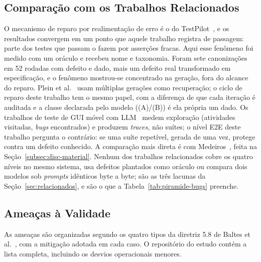 \documentclass[12pt]{article}
\begin{document}
\subsection{Comparação com os Trabalhos Relacionados}
\label{subsec:disc-relacionados}

O mecanismo de reparo por realimentação de erro é o do
TestPilot~\cite{schafer2024testpilot}, e os resultados convergem em um ponto
que aquele trabalho registra de passagem: parte dos testes que passam o
fazem por asserções fracas. Aqui esse fenômeno foi medido com um oráculo e
recebeu nome e taxonomia. Foram sete canonizações em 52 rodadas com defeito e
dado, mais um defeito real transformado em especificação, e o fenômeno
mostrou-se concentrado na geração, fora do alcance do reparo. Plein et al.~\cite{plein2023bugreports}
usam múltiplas gerações como recuperação; o ciclo de reparo deste trabalho
tem o mesmo papel, com a diferença de que cada iteração é auditada e a
classe declarada pelo modelo ((A)/(B)) é ela própria um dado. Os trabalhos de
teste de GUI móvel com LLM~\cite{liu2024gptdroid,yoon2024droidagent,liu2023qtypist}
medem exploração (atividades visitadas, \textit{bugs} encontrados) e
produzem \textit{traces}, não suítes; o nível E2E deste trabalho pergunta o
contrário: se uma suíte repetível, gerada de uma vez, protege contra um
defeito conhecido. A comparação mais direta é com
Medeiros~\cite{medeiros2026acessibilidade}, feita na
Seção~\ref{subsec:disc-material}. Nenhum dos trabalhos relacionados cobre os quatro níveis no
mesmo sistema, usa defeitos plantados como oráculo ou compara dois modelos
sob \textit{prompts} idênticos byte a byte; são as três lacunas da
Seção~\ref{sec:relacionados}, e são o que a Tabela~\ref{tab:piramide-bugs}
preenche.

\subsection{Ameaças à Validade}
\label{subsec:ameacas}

As ameaças são organizadas segundo os quatro tipos da diretriz 5.8 de
Baltes et al.~\cite{baltes2026guidelines}, com a mitigação adotada em cada
caso. O repositório do estudo contém a lista completa, incluindo os desvios
operacionais menores.
\end{document}

